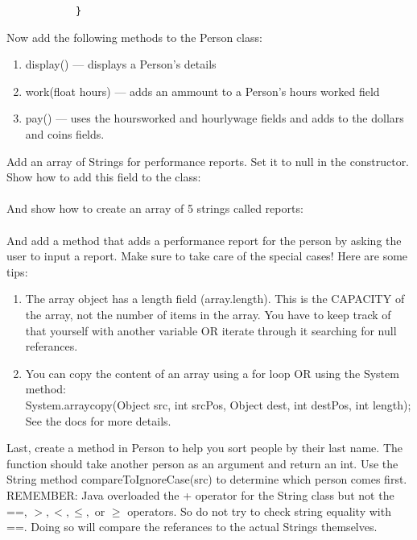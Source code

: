\documentclass{article}
\begin{document}
\begin{steps}
      \begin{verbatim}
            }
      \end{verbatim}
      \item Now add the following methods to the Person class:
         \begin{enumerate}[label=\Alph*.]
            \item display() --- displays a Person's details
            \item work(float hours) --- adds an ammount to a Person's hours\textunderscore
               worked field
            \item pay() --- uses the hours\textunderscore worked and hourly\textunderscore wage
               fields and adds to the dollars and coins fields.
         \end{enumerate}
      \item Add an array of Strings for performance reports.  Set it to null in the constructor.
         Show how to add this field to the class:
         \vspace{.5cm}\\
         \underline{\hspace{15cm}}\\
         And show how to create an array of 5 strings called reports:
         \vspace{.5cm}\\
         \underline{\hspace{15cm}}\\
         And add a method that adds a performance report for the person by asking the user to
         input a report. Make sure to take care of the special cases! Here are some tips:
         \begin{enumerate}[label=\Alph*.]
            \item The array object has a length field (array.length). This is the CAPACITY
               of the array, not the number of items in the array. You have to keep track
               of that yourself with another variable OR iterate through it searching for
               null referances.
            \item You can copy the content of an array using a for loop OR using the System
               method:\\
               System.arraycopy(Object src, int srcPos, Object dest, int destPos, int length);\\
               See the docs for more details.
         \end{enumerate} 
      \item Last, create a method in Person to help you sort people by their last name.
         The function should take another person as an argument and return an int.
         Use the String method
         compareToIgnoreCase(src) to determine which person comes first.\\
            REMEMBER: Java overloaded the + operator for the String class but not the ==,
            $>, <, \leq,$ or $\geq$ operators. So do not try to check string equality with ==.
            Doing so will compare the referances to the actual Strings themselves.
   \end{steps}
   
\end{document}
